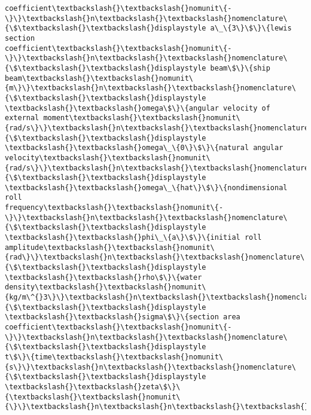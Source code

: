 \begin{tcolorbox}[breakable, size=fbox, boxrule=.5pt, pad at break*=1mm, opacityfill=0]
\begin{Verbatim}[commandchars=\\\{\}]
coefficient\textbackslash{}\textbackslash{}nomunit\{-\}\}\textbackslash{}n\textbackslash{}\textbackslash{}nomenclature\{\$\textbackslash{}\textbackslash{}displaystyle a\_\{3\}\$\}\{lewis section
coefficient\textbackslash{}\textbackslash{}nomunit\{-\}\}\textbackslash{}n\textbackslash{}\textbackslash{}nomenclature\{\$\textbackslash{}\textbackslash{}displaystyle beam\$\}\{ship
beam\textbackslash{}\textbackslash{}nomunit\{m\}\}\textbackslash{}n\textbackslash{}\textbackslash{}nomenclature\{\$\textbackslash{}\textbackslash{}displaystyle \textbackslash{}\textbackslash{}omega\$\}\{angular velocity of
external moment\textbackslash{}\textbackslash{}nomunit\{rad/s\}\}\textbackslash{}n\textbackslash{}\textbackslash{}nomenclature\{\$\textbackslash{}\textbackslash{}displaystyle
\textbackslash{}\textbackslash{}omega\_\{0\}\$\}\{natural angular
velocity\textbackslash{}\textbackslash{}nomunit\{rad/s\}\}\textbackslash{}n\textbackslash{}\textbackslash{}nomenclature\{\$\textbackslash{}\textbackslash{}displaystyle
\textbackslash{}\textbackslash{}omega\_\{hat\}\$\}\{nondimensional roll
frequency\textbackslash{}\textbackslash{}nomunit\{-\}\}\textbackslash{}n\textbackslash{}\textbackslash{}nomenclature\{\$\textbackslash{}\textbackslash{}displaystyle \textbackslash{}\textbackslash{}phi\_\{a\}\$\}\{initial roll
amplitude\textbackslash{}\textbackslash{}nomunit\{rad\}\}\textbackslash{}n\textbackslash{}\textbackslash{}nomenclature\{\$\textbackslash{}\textbackslash{}displaystyle \textbackslash{}\textbackslash{}rho\$\}\{water
density\textbackslash{}\textbackslash{}nomunit\{kg/m\^{}3\}\}\textbackslash{}n\textbackslash{}\textbackslash{}nomenclature\{\$\textbackslash{}\textbackslash{}displaystyle \textbackslash{}\textbackslash{}sigma\$\}\{section area
coefficient\textbackslash{}\textbackslash{}nomunit\{-\}\}\textbackslash{}n\textbackslash{}\textbackslash{}nomenclature\{\$\textbackslash{}\textbackslash{}displaystyle
t\$\}\{time\textbackslash{}\textbackslash{}nomunit\{s\}\}\textbackslash{}n\textbackslash{}\textbackslash{}nomenclature\{\$\textbackslash{}\textbackslash{}displaystyle
\textbackslash{}\textbackslash{}zeta\$\}\{\textbackslash{}\textbackslash{}nomunit\{\}\}\textbackslash{}n\textbackslash{}n\textbackslash{}\textbackslash{}printnomenclature"
\end{Verbatim}
\end{tcolorbox}
        

    
    
    
